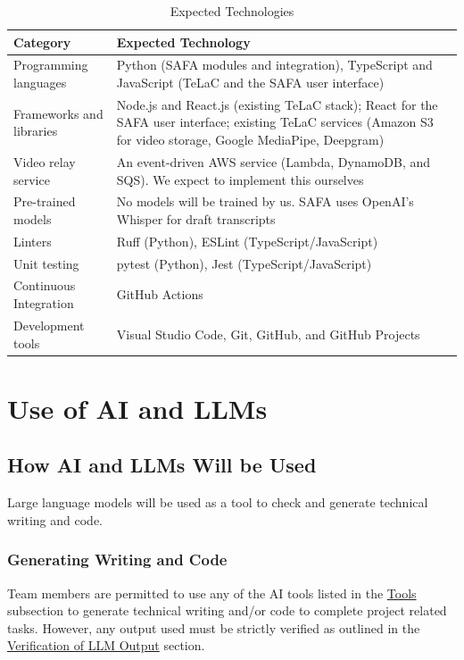 \documentclass{article}
\begin{document}
\begin{table}[H]
    \caption{Expected Technologies}\label{ExpectedTechnology}
    \renewcommand{\arraystretch}{1.1}
    \setlength{\tabcolsep}{5pt}
    \begin{tabularx}{\textwidth}{p{4cm} X}
    \toprule
    \textbf{Category} & \textbf{Expected Technology}\\
    \midrule
    Programming languages & Python (SAFA modules and integration), TypeScript
    and JavaScript (TeLaC and the SAFA user interface)\\
    Frameworks and libraries & Node.js and React.js (existing TeLaC stack);
    React for the SAFA user interface; existing TeLaC services (Amazon S3 for
    video storage, Google MediaPipe, Deepgram)\\
    Video relay service & An event-driven AWS service (Lambda, DynamoDB, and SQS). We expect to implement this
    ourselves\\
    Pre-trained models & No models will be trained by us. SAFA uses OpenAI's
    Whisper for draft transcripts\\
    Linters & Ruff (Python), ESLint (TypeScript/JavaScript)\\
    Unit testing & pytest (Python), Jest (TypeScript/JavaScript)\\
    Continuous Integration & GitHub Actions\\
    Development tools & Visual Studio Code, Git, GitHub, and GitHub Projects\\
    \bottomrule
    \end{tabularx}
\end{table}
\section{Use of AI and LLMs}

\subsection{How AI and LLMs Will be Used}
Large language models will be used as a tool to check and generate technical writing and code. 

\subsubsection{Generating Writing and Code}
Team members are permitted to use any of the AI tools listed in the \hyperref[sec:Tools]{Tools} subsection to generate technical writing and/or code to complete project related tasks. 
However, any output used must be strictly verified as outlined in the \hyperref[sec:Verf_LLM_Output]{Verification of LLM Output} section.
\end{document}
